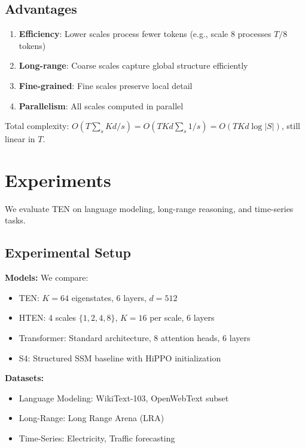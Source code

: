 \documentclass[11pt,letterpaper]{article}
\begin{document}
\subsection{Advantages}

\begin{enumerate}
    \item \textbf{Efficiency}: Lower scales process fewer tokens (e.g., scale 8 processes $T/8$ tokens)
    \item \textbf{Long-range}: Coarse scales capture global structure efficiently
    \item \textbf{Fine-grained}: Fine scales preserve local detail
    \item \textbf{Parallelism}: All scales computed in parallel
\end{enumerate}

Total complexity: $O(T \sum_{s} Kd/s) = O(TKd \sum_s 1/s) = O(TKd \log |S|)$, still linear in $T$.

\section{Experiments}
\label{sec:experiments}

We evaluate TEN on language modeling, long-range reasoning, and time-series tasks.

\subsection{Experimental Setup}

\textbf{Models:} We compare:
\begin{itemize}
    \item TEN: $K=64$ eigenstates, 6 layers, $d=512$
    \item HTEN: 4 scales $\{1,2,4,8\}$, $K=16$ per scale, 6 layers
    \item Transformer: Standard architecture, 8 attention heads, 6 layers
    \item S4: Structured SSM baseline with HiPPO initialization
\end{itemize}

\textbf{Datasets:}
\begin{itemize}
    \item Language Modeling: WikiText-103, OpenWebText subset
    \item Long-Range: Long Range Arena (LRA) \cite{tay2021long}
    \item Time-Series: Electricity, Traffic forecasting
\end{itemize}
\end{document}
